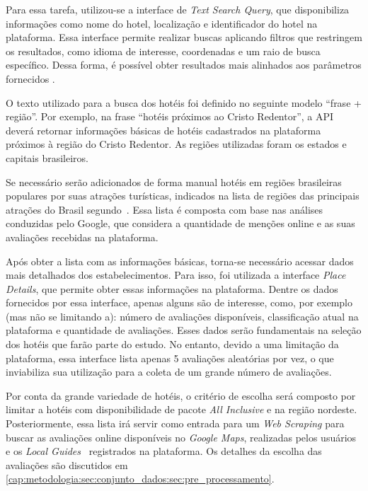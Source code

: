 Para essa tarefa, utilizou-se a interface de \emph{Text Search Query}, que disponibiliza informações como nome do hotel, localização e identificador do hotel na plataforma. Essa interface permite realizar buscas aplicando filtros que restringem os resultados, como idioma de interesse, coordenadas e um raio de busca específico. Dessa forma, é possível obter resultados mais alinhados aos parâmetros fornecidos \cite{placesSearchText2023}.



O texto utilizado para a busca dos hotéis foi definido no seguinte modelo “frase + região”. Por exemplo, na frase “hotéis próximos ao Cristo Redentor”, a API deverá retornar informações básicas de hotéis cadastrados na plataforma próximos à região do Cristo Redentor. As regiões utilizadas foram os estados e capitais brasileiros.

Se necessário serão adicionados de forma manual hotéis em regiões brasileiras populares por suas atrações turísticas, indicados na lista de regiões das principais atrações do Brasil segundo~. Essa lista é composta com base nas análises conduzidas pelo Google, que considera a quantidade de menções online e as suas avaliações recebidas na plataforma.

Após obter a lista com as informações básicas, torna-se necessário acessar dados mais detalhados dos estabelecimentos. Para isso, foi utilizada a interface \emph{Place Details}, que permite obter essas informações na plataforma. Dentre os dados fornecidos por essa interface, apenas alguns são de interesse, como, por exemplo (mas não se limitando a): número de avaliações disponíveis, classificação atual na plataforma e quantidade de avaliações. Esses dados serão fundamentais na seleção dos hotéis que farão parte do estudo. No entanto, devido a uma limitação da plataforma, essa interface lista apenas 5 avaliações aleatórias por vez, o que inviabiliza sua utilização para a coleta de um grande número de avaliações.




Por conta da grande variedade de hotéis, o critério de escolha será composto por limitar a hotéis com disponibilidade de pacote \emph{All Inclusive} e na região nordeste. Posteriormente, essa lista irá servir como entrada para um \emph{Web Scraping} para buscar as avaliações online disponíveis no \textit{Google Maps}, realizadas pelos usuários e os \emph{Local Guides}~\cite{google2022localguides} registrados na plataforma. Os detalhes da escolha das avaliações são discutidos em \ref{cap:metodologia:sec:conjunto_dados:sec:pre_processamento}.

